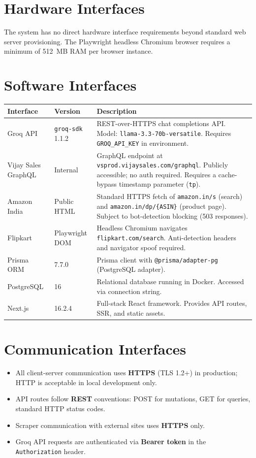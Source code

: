 \documentclass[12pt,a4paper]{report}
\begin{document}
\section{Hardware Interfaces}
The system has no direct hardware interface requirements beyond standard web
server provisioning. The Playwright headless Chromium browser requires a minimum
of 512~MB RAM per browser instance.

\section{Software Interfaces}

\begin{longtable}{L{3cm} L{3cm} L{7cm}}
  \toprule
  \textbf{Interface} & \textbf{Version} & \textbf{Description} \\
  \midrule
  \endhead
  Groq API &
  \texttt{groq-sdk} 1.1.2 &
  REST-over-HTTPS chat completions API. Model: \texttt{llama-3.3-70b-versatile}.
  Requires \texttt{GROQ\_API\_KEY} in environment. \\[3pt]
  Vijay Sales GraphQL &
  Internal &
  GraphQL endpoint at \texttt{vsprod.vijaysales.com/graphql}. Publicly
  accessible; no auth required. Requires a cache-bypass timestamp
  parameter (\texttt{tp}). \\[3pt]
  Amazon India &
  Public HTML &
  Standard HTTPS fetch of \texttt{amazon.in/s} (search) and
  \texttt{amazon.in/dp/\{ASIN\}} (product page). Subject to bot-detection
  blocking (503 responses). \\[3pt]
  Flipkart &
  Playwright DOM &
  Headless Chromium navigates \texttt{flipkart.com/search}. Anti-detection
  headers and navigator spoof required. \\[3pt]
  Prisma ORM &
  7.7.0 &
  Prisma client with \texttt{@prisma/adapter-pg} (PostgreSQL adapter). \\[3pt]
  PostgreSQL &
  16 &
  Relational database running in Docker. Accessed via connection string. \\[3pt]
  Next.js &
  16.2.4 &
  Full-stack React framework. Provides API routes, SSR, and static assets. \\
  \bottomrule
\end{longtable}

\section{Communication Interfaces}
\begin{itemize}[noitemsep]
  \item All client-server communication uses \textbf{HTTPS} (TLS 1.2+) in
        production; HTTP is acceptable in local development only.
  \item API routes follow \textbf{REST} conventions: POST for mutations,
        GET for queries, standard HTTP status codes.
  \item Scraper communication with external sites uses \textbf{HTTPS} only.
  \item Groq API requests are authenticated via \textbf{Bearer token} in the
        \texttt{Authorization} header.
\end{itemize}
\end{document}
